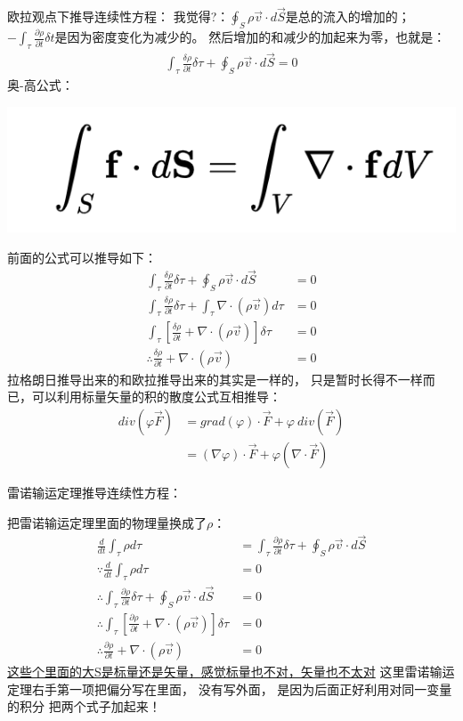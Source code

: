 \documentclass[UTF8,12pt]{article}
\begin{document}
欧拉观点下推导连续性方程：
{\color{red} 我觉得?}：$\oint_S \rho \vec v \cdot d\vec S$是总的流入的增加的；
$-\int_{\tau} \frac{\partial \rho}{\partial t}\delta t$是因为密度变化为减少的。
然后增加的和减少的加起来为零，也就是：
\begin{align*}
    \int_{\tau} \frac{\delta \rho}{\partial t} \delta \tau +
    \oint_S \rho \vec v \cdot d\vec S = 0
\end{align*}
奥-高公式：
\begin{center}
    \includegraphics[width=0.4\linewidth]{img/ao-gao.png}
\end{center}
前面的公式可以推导如下：
\begin{align*}
    \int_{\tau} \frac{\delta \rho}{\partial t} \delta \tau +
    \oint_S \rho \vec v \cdot d\vec S &= 0\\
    \int_{\tau} \frac{\delta \rho}{\partial t} \delta \tau + 
    \int_{\tau} \nabla \cdot (\rho \vec v) d\tau &= 0\\
    \int_{\tau} [\frac{\delta \rho}{\partial t} + \nabla \cdot (\rho \vec v) ] \delta \tau &= 0\\
    \therefore \frac{\delta \rho}{\partial t} + \nabla \cdot (\rho \vec v) &= 0
\end{align*}
拉格朗日推导出来的和欧拉推导出来的其实是一样的，
只是暂时长得不一样而已，可以利用标量矢量的积的散度公式互相推导：
\begin{align*}
    div(\varphi \vec F) &= grad(\varphi)\cdot \vec F +\varphi ~ div(\vec F)\\
                        &= (\nabla \varphi)\cdot \vec F + \varphi(\nabla \cdot \vec F)
\end{align*}

雷诺输运定理推导连续性方程：

把雷诺输运定理里面的物理量换成了$\rho$：
\begin{align*}
    \frac{d}{dt} \int_{\tau} \rho d\tau &= 
    \int_{\tau} \frac{\partial \rho}{\partial t} \delta \tau 
    + \oint_S \rho \vec v \cdot d \vec S \\
    \because \frac{d}{dt} \int_{\tau} \rho d\tau &= 0\\
    \therefore \int_{\tau} \frac{\partial \rho}{\partial t} \delta \tau 
    + \oint_S \rho \vec v \cdot d \vec S &= 0\\
    \therefore \int_{\tau} [\frac{\partial \rho}{\partial t} + \nabla \cdot (\rho \vec v)] \delta \tau &= 0\\
    \therefore \frac{\partial \rho}{\partial t} + \nabla \cdot (\rho \vec v) &= 0
\end{align*}
{\color{red} \uline{这些个里面的大S是标量还是矢量，感觉标量也不对，矢量也不太对}}
这里雷诺输运定理右手第一项把偏分写在里面，
没有写外面，
是因为后面正好利用对同一变量的积分
把两个式子加起来！
\end{document}
